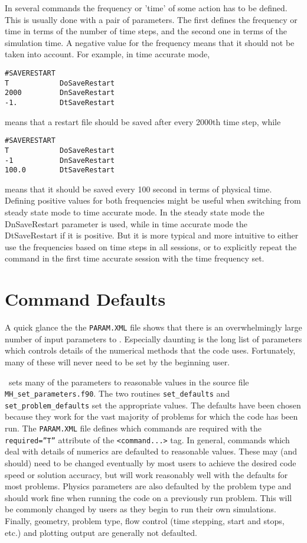 In several commands the frequency or 'time' of some action has
to be defined. This is usually done with a pair of parameters.
The first defines the frequency or time in terms of the number of time steps,
and the second one in terms of the simulation time.
A negative value for the frequency means that it should not be taken 
into account. For example, in time accurate mode,
\begin{verbatim}
#SAVERESTART
T            DoSaveRestart
2000         DnSaveRestart
-1.          DtSaveRestart
\end{verbatim}
means that a restart file should be saved after every 2000th time step, while
\begin{verbatim}
#SAVERESTART
T            DoSaveRestart
-1           DnSaveRestart
100.0        DtSaveRestart
\end{verbatim}
means that it should be saved every 100 second in terms of physical time.
Defining positive values for both frequencies might be useful
when switching from steady state mode to time accurate mode.
In the steady state mode the DnSaveRestart parameter is used,
while in time accurate mode the DtSaveRestart if it is positive.
But it is more typical and more intuitive to either 
use the frequencies based on time steps in all sessions, 
or to explicitly repeat the command in the first 
time accurate session with the time frequency set.

\section{Command Defaults \label{section:defaults}}

A quick glance the the {\tt PARAM.XML} file shows that there is an 
overwhelmingly large number of input parameters to \BATSRUS.  
Especially daunting is the long
list of parameters which controls details of the numerical methods that the
code uses.  Fortunately, many of these will never need to be set by the 
beginning user.  

\BATSRUS\ sets many of the parameters to reasonable values in the source file 
{\tt MH\_set\_parameters.f90}.  The two routines
{\tt set\_defaults} and {\tt set\_problem\_defaults} set 
the appropriate values.
The defaults have been chosen because they work for the vast
majority of problems for which the code has been run.  
The {\tt PARAM.XML} file defines which commands are required
with the {\tt required=''T''} attribute of the {\tt <command...>} tag.
In general, commands which deal with details of numerics are defaulted to 
reasonable values.
These may (and should) need to be changed eventually by most users 
to achieve the desired code speed or solution accuracy, but will
work reasonably well with the defaults for most problems.
Physics parameters are also defaulted by the problem type and should work fine
when running the code on a previously run problem.  
This will be commonly changed by users as they begin to run their 
own simulations. Finally, geometry, problem type,
flow control (time stepping, start and stops, etc.) and plotting output 
are generally not defaulted.

